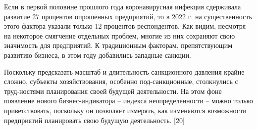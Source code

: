 \documentclass[14pt,a4paper]{article}
\begin{document}
    Если в первой половине прошлого года коронавирусная инфекция сдерживала развитие 27 процентов опрошенных предприятий, то в 2022 г. на существенность этого фактора указали только 12 процентов респондентов.
    Как видим, несмотря на некоторое смягчение отдельных проблем, многие из них сохраняют свою значимость для предприятий.
    К традиционным факторам, препятствующим развитию бизнеса, в этом году добавились западные санкции.
    \par
    Поскольку предсказать масштаб и длительность санкционного давления крайне сложно, субъекты хозяйствования, особенно под-санкционные, столкнулись с труд-ностями планирования своей будущей деятельности.
    На этом фоне появление нового бизнес-индикатора – индекса неопределенности – можно только приветствовать, поскольку он позволяет измерять, как изменяются возможности предприятий планировать свою будущую деятельность.
    [20]
    \par
\end{document}

